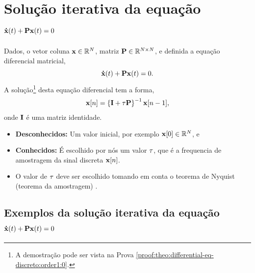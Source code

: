\section{ Solução iterativa da equação $\DTVECTOR{x}(t) + \MATRIX{P} \VECTOR{x}(t)=0$ }

\begin{theorem}[Equação 
$\DTVECTOR{x}(t) + \MATRIX{P} \VECTOR{x}(t)=0$ com diferenças regressivas:]
\label{theo:differential-eq-discreto:order1:0}
Dados, o vetor coluna $\VECTOR{x} \in \mathbb{R}^N$, matriz $\MATRIX{P} \in \mathbb{R}^{N\times N}$, 
e definida a equação diferencial matricial,
\begin{equation}
\DTVECTOR{x}(t) + \MATRIX{P} \VECTOR{x}(t)=0.
\end{equation}
A solução\footnote{A
demostração pode ser vista na Prova \ref{proof:theo:differential-eq-discreto:order1:0}.} desta equação diferencial tem  a forma,
\begin{equation}
  \VECTOR{x}[n]=\left\{\MATRIX{I} + \ToS \MATRIX{P}\right\}^{-1}\VECTOR{x}[n-1],
\end{equation}
onde $\MATRIX{I}$ é uma matriz identidade.
\begin{itemize}
\item \textbf{Desconhecidos:} Um valor inicial, por exemplo $\VECTOR{x}[0] \in \mathbb{R}^{N}$, e
\item  \textbf{Conhecidos:} É escolhido por nós um valor $\tau$, 
que é a frequencia de amostragem da sinal discreta $\VECTOR{x}[n]$.
\end{itemize}
\end{theorem}

\begin{tcbattention}
\begin{itemize}
\item O valor de $\tau$ deve ser escolhido tomando em conta o teorema de Nyquist (teorema da amostragem) 
\cite[pp. 67]{rochol2009comunicacao} \cite[pp. 122]{forouzan2009comunicacao}.
\end{itemize}
\end{tcbattention}

\subsection{Exemplos da solução iterativa da equação $\DTVECTOR{x}(t) + \MATRIX{P} \VECTOR{x}(t)=0$}

